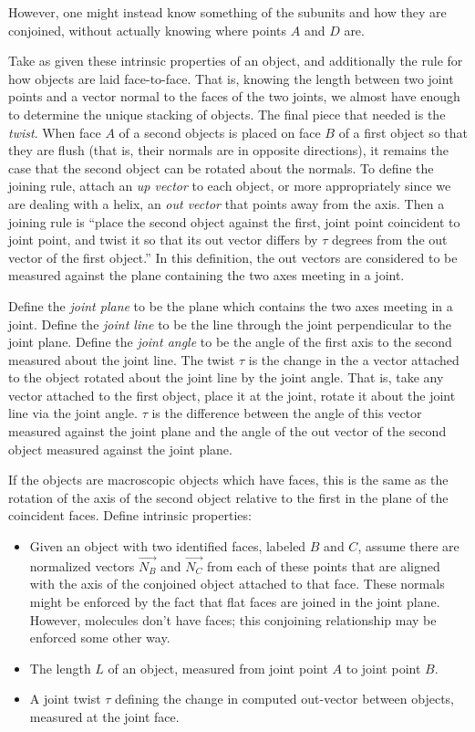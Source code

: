 \documentclass[11pt]{article}
\begin{document}
{However, one might instead know something of the subunits and
how they are conjoined, without actually knowing where points $A$
and $D$ are.

Take as given these intrinsic properties of an object, and additionally the
rule for how objects are laid face-to-face. That is, knowing the length between two
joint points and a vector normal to the faces of the two joints, we almost have
enough to determine the unique stacking of objects. The final piece
that needed is
the {\em twist}. When face $A$ of a second objects is placed on face $B$
of a first object so that they are flush (that is, their normals are in opposite directions),
it remains the case that the second object can be rotated about the normals. To
define the joining rule, attach an {\em up vector} to each object, or more appropriately
since we are dealing with a helix, an {\em out vector} that points away from the axis.
Then a joining
rule is ``place the second object against the first, joint point coincident to joint point,
and twist it so that its out vector differs by $\tau$ degrees from the out vector of the first
object.'' In this definition, the out vectors are considered to be measured against the plane
containing the two axes meeting in a joint.

Define the {\em joint plane} to be the plane which contains the two axes meeting in a joint.
Define the {\em joint line} to be the line through the joint perpendicular to the joint plane.
Define the {\em joint angle} to be the angle of the first axis to the second measured about
the joint line.
The twist $\tau$ is the change in the a vector attached to the object rotated about the joint
line by the joint angle. That is, take any vector attached to the first object, place it at
the joint, rotate it about the joint line via the joint angle. $\tau$ is the difference
between the angle of this vector measured against the joint plane and the angle of the
out vector of the second object measured against the joint plane.

If the objects are macroscopic objects which have faces, this is the same as the rotation
of the axis of the second object relative to the first in the plane of the coincident faces.
Define intrinsic properties:

\begin{itemize}
\item Given an object with two identified faces, labeled $B$ and $C$, assume there are normalized
  vectors $\overrightarrow{N_B}$ and $\overrightarrow{N_C}$
  from each of these points that are aligned with the axis of the conjoined object attached to
  that face. These normals might be enforced by the fact that flat faces are joined in the joint plane.
  However, molecules don't have faces; this conjoining relationship may be enforced some other way.
\item The length $L$ of an object, measured from joint point $A$ to joint point $B$.
\item A joint twist $\tau$ defining the change in computed out-vector between objects,
  measured at the joint face.
\end{itemize}

}
\end{document}
